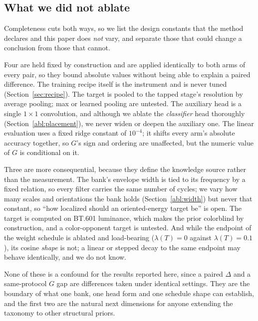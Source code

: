 \subsection{What we did not ablate}\label{abl:notablated}
Completeness cuts both ways, so we list the design constants that the
method declares and this paper does \emph{not} vary, and separate those
that could change a conclusion from those that cannot.

Four are held fixed by construction and are applied identically to both
arms of every pair, so they bound absolute values without being able to
explain a paired difference. The training recipe itself is the instrument
and is never tuned (Section~\ref{sec:recipe}). The target is pooled to the
tapped stage's resolution by average pooling; max or learned pooling are
untested. The auxiliary head is a single $1{\times}1$ convolution, and
although we ablate the \emph{classifier} head thoroughly
(Section~\ref{abl:placement}), we never widen or deepen the auxiliary one.
The linear evaluation uses a fixed ridge constant of $10^{-4}$; it shifts
every arm's absolute accuracy together, so $G$'s sign and ordering are
unaffected, but the numeric value of $G$ is conditional on it.

Three are more consequential, because they define the knowledge source
rather than the measurement. The bank's envelope width is tied to its
frequency by a fixed relation, so every filter carries the same number of
cycles; we vary how many scales and orientations the bank holds
(Section~\ref{abl:width}) but never that constant, so ``how localized
should an oriented-energy target be'' is open. The target is computed on
BT.601 luminance, which makes the prior colorblind by construction, and a
color-opponent target is untested. And while the endpoint of the weight
schedule is ablated and load-bearing ($\lambda(T)=0$ against
$\lambda(T)=0.1$), its cosine \emph{shape} is not; a linear or stepped
decay to the same endpoint may behave identically, and we do not know.

None of these is a confound for the results reported here, since a
paired $\Delta$ and a same-protocol $G$ gap are differences taken under
identical settings. They are the boundary of what one bank, one head form
and one schedule shape can establish, and the first two are the natural
next dimensions for anyone extending the taxonomy to other structural
priors.

